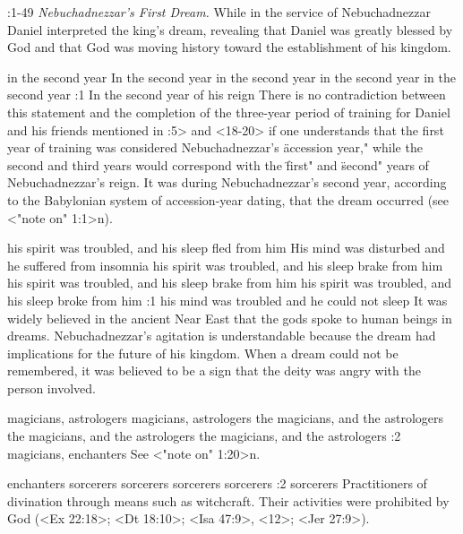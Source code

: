 :1-49 {} {\it Nebuchadnezzar's First Dream.\/} While in the service of Nebuchadnezzar Daniel interpreted the
king's dream, revealing that Daniel was greatly blessed by God and that God was moving  
history toward the establishment of his kingdom.

    {in the second year} %
    {In the second year} %
    {in the second year} %
    {in the second year} %
    {in the second year} %
:1 {In the second year of his reign} There is no contradiction 
between this statement and the completion of the three-year period of training for Daniel and his
friends mentioned in :5> and  <18-20> if one understands that the first year of training was
considered Nebuchadnezzar's \"accession year," while the second and  
third years would correspond with the \"first" and \"second" years 
of Nebuchadnezzar's reign. It was during Nebuchadnezzar's second year, according to the Babylonian
system of accession-year  dating, that the dream occurred (see <"note on" 1:1>n).

    {his spirit was troubled, and his sleep fled from him} %
    {His mind was disturbed and he suffered from insomnia} %
    {his spirit was troubled, and his sleep brake from him} %
    {his spirit was troubled, and his sleep brake from him} %
    {his spirit was troubled, and his sleep broke from him} %
:1 {his mind was troubled and he could not sleep} It was widely believed in the 
ancient Near East that the gods spoke to human beings in dreams. 
Nebuchadnezzar's agitation is understandable because the dream 
had implications for the future of his kingdom. When a dream 
could not be remembered, it was believed to be a sign that the deity was angry with the person
involved.

    {magicians, astrologers} %
    {magicians,   astrologers} %
    {the magicians, and the astrologers} %
    {the magicians, and the astrologers} %
    {the magicians, and the astrologers} %
:2 {magicians, enchanters} See <"note on" 1:20>n.



    {enchanters} %
    {sorcerers} %
    {sorcerers} %
    {sorcerers} %
    {sorcerers} %
:2 {sorcerers} Practitioners of divination through means
such as witchcraft. Their activities were prohibited by God (<Ex 22:18>; <Dt 18:10>; <Isa 47:9>,
<12>; <Jer 27:9>).

